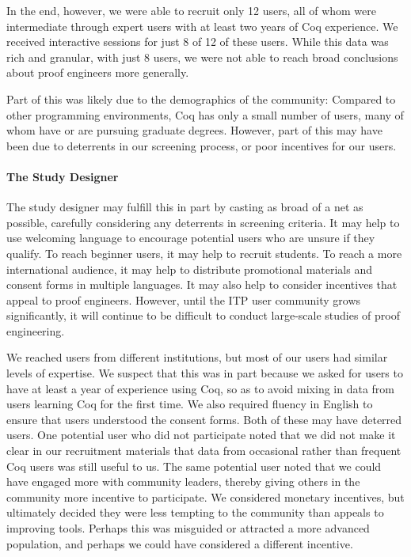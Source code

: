In the end, however, we were able to recruit only 12 users,
all of whom were intermediate through expert users with at least two years
of Coq experience. We received interactive sessions for just 8 of 12
of these users. While this data was rich and granular, with just 8 users,
we were not able to reach broad conclusions about proof engineers more generally.

Part of this was likely due to the demographics of the
community: Compared to other programming environments,
Coq has only a small number of users,
many of whom have or are pursuing graduate degrees.
However, part of this may have been due to
deterrents in our screening process, or poor incentives for our users.

\paragraph{The Study Designer}
The study designer may fulfill this in part by casting as broad of a net
as possible, carefully considering any deterrents in screening criteria.
It may help to use welcoming language to encourage potential users
who are unsure if they qualify.
To reach beginner users, it may help to recruit students.
To reach a more international audience, it may help to distribute
promotional materials and consent forms in multiple languages.
It may also help to consider incentives that appeal to proof engineers.
However, until the ITP user community grows significantly, it will continue 
to be difficult to conduct large-scale studies of proof engineering.

We reached users from different institutions, but
most of our users had similar levels of expertise. We suspect that this was
in part because we asked for users to have at least a year of 
experience using Coq, so as to avoid mixing in data from
users learning Coq for the first time.
We also required fluency in English to ensure that users understood
the consent forms.
Both of these may have deterred users.
One potential user who did not participate noted that we did not make
it clear in our recruitment materials that data from occasional rather
than frequent Coq users was still useful to us.
The same potential user noted that we could have engaged more
with community leaders, thereby giving others in the community
more incentive to participate.
We considered monetary incentives, but ultimately decided they were less
tempting to the community than appeals to improving tools.
Perhaps this was misguided or attracted a more advanced population,
and perhaps we could have considered a different incentive.

